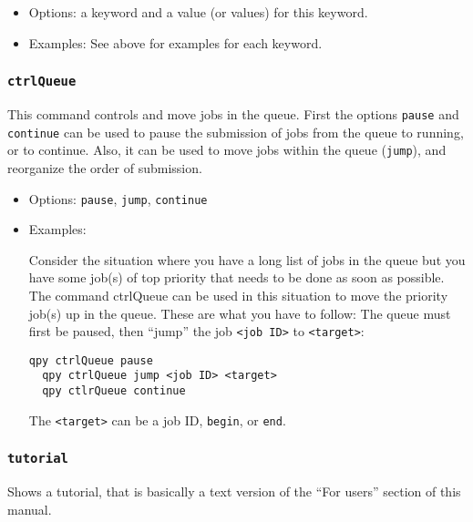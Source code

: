 \documentclass[a4paper,12pt]{article}
\begin{document}
\begin{itemize}

\item Options: a keyword and a value (or values) for this keyword.

\item Examples: See above for examples for each keyword.

\end{itemize}

\subsubsection{\texttt{ctrlQueue}}

This command controls and move jobs in the queue.
First the options \texttt{pause} and \texttt{continue} can be used to pause the submission of jobs from the queue to running, or to continue.
Also, it can be used to move jobs within the queue (\texttt{jump}), and reorganize the order of submission.

\begin{itemize}

\item Options: \texttt{pause}, \texttt{jump}, \texttt{continue}

\item Examples:

Consider the situation where you have a long list of jobs in the queue but you have some job(s) of top priority that needs to be done as soon as possible.
The command ctrlQueue can be used in this situation to move the priority job(s) up in the queue.
These are what you have to follow:
The queue must first be paused, then ``jump'' the job \texttt{<job ID>} to \texttt{<target>}:

\begin{lstlisting}[style=BashStyle]
  qpy ctrlQueue pause
  qpy ctrlQueue jump <job ID> <target>
  qpy ctlrQueue continue
\end{lstlisting}

The \texttt{<target>} can be a job ID, \texttt{begin}, or \texttt{end}.

\end{itemize}

\subsubsection{\texttt{tutorial}}

Shows a tutorial, that is basically a text version of the ``For users'' section of this manual.
\end{document}
